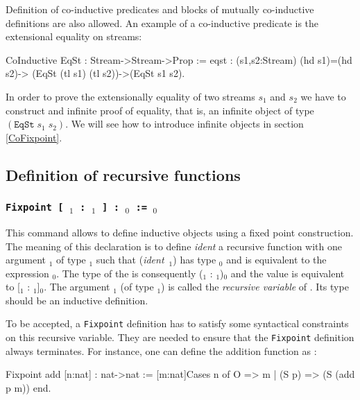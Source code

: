 Definition of co-inductive predicates and blocks of mutually
co-inductive definitions are also allowed. An example of a
co-inductive predicate is the extensional equality on streams:

\begin{coq_example}
CoInductive EqSt  : Stream->Stream->Prop := 
            eqst : (s1,s2:Stream)
                    (hd s1)=(hd s2)->
                     (EqSt (tl s1) (tl s2))->(EqSt s1 s2).
\end{coq_example}

In order to prove the extensionally equality of two streams $s_1$ and
$s_2$ we have to construct and infinite proof of equality, that is,
an infinite object of type $(\texttt{EqSt}\;s_1\;s_2)$. We will see
how to introduce infinite objects in section \ref{CoFixpoint}.

\subsection{Definition of recursive functions}

\subsubsection{\tt Fixpoint {\ident} [ \ident$_1$ : \type$_1$ ] :
\type$_0$ := \term$_0$}
\label{Fixpoint}

This command allows to define inductive objects using a fixed point
construction. The meaning of this declaration is to define {\it
ident} a recursive function with one argument \ident$_1$ of type
\term$_1$ such that ({\it ident}~\ident$_1$) has type \type$_0$ and is
equivalent to the expression \term$_0$. The type of the {\ident} is
consequently {(\ident$_1$ : \type$_1$)\type$_0$} and the value is
equivalent to [\ident$_1$ : \type$_1$]\term$_0$.  The argument
{\ident$_1$} (of type {\type$_1$}) is called the {\em recursive
variable} of {\ident}.  Its type should be an inductive definition.

To be accepted, a {\tt Fixpoint} definition has to satisfy some
syntactical constraints on this recursive variable. They are needed to
ensure that the {\tt Fixpoint} definition always terminates. For
instance, one can define the addition function as :

\begin{coq_example}
Fixpoint add [n:nat] : nat->nat 
   := [m:nat]Cases n of O => m | (S p) => (S (add p m)) end.
\end{coq_example}

